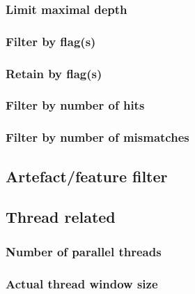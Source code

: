 \documentclass[10pt,a4paper,final]{article}
\begin{document}
\subsubsection{Limit maximal depth}

\subsubsection{Filter by flag(s)}\label{sec:filter_flag}

\subsubsection{Retain by flag(s)}

\subsubsection{Filter by number of hits}

\subsubsection{Filter by number of mismatches}

\subsection{Artefact/feature filter}\label{sec:cli_artefact_filter}

\subsection{Thread related}
\subsubsection{Number of parallel threads}

\subsubsection{Actual thread window size}

\end{document}
